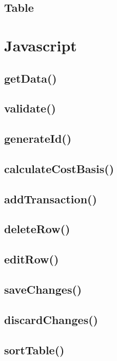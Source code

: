 \documentclass[letterpaper]{article}
\begin{document}
\subsection{Table}

\newpage

\section{Javascript}\label{JS}

\subsection{getData()}

\subsection{validate()}

\subsection{generateId()}

\subsection{calculateCostBasis()}

\subsection{addTransaction()}

\subsection{deleteRow()}

\subsection{editRow()}

\subsection{saveChanges()}

\subsection{discardChanges()}

\subsection{sortTable()}
\end{document}
